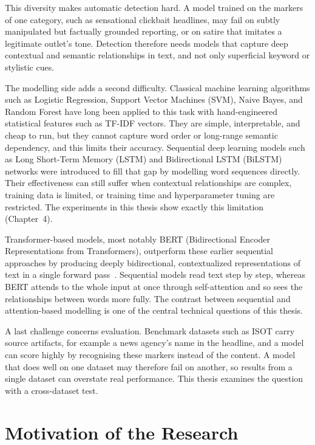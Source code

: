 This diversity makes automatic detection hard. A model trained on the markers of one category, such as sensational clickbait headlines, may fail on subtly manipulated but factually grounded reporting, or on satire that imitates a legitimate outlet's tone. Detection therefore needs models that capture deep contextual and semantic relationships in text, and not only superficial keyword or stylistic cues.

The modelling side adds a second difficulty. Classical machine learning algorithms such as Logistic Regression, Support Vector Machines (SVM), Naive Bayes, and Random Forest have long been applied to this task with hand-engineered statistical features such as TF-IDF vectors. They are simple, interpretable, and cheap to run, but they cannot capture word order or long-range semantic dependency, and this limits their accuracy. Sequential deep learning models such as Long Short-Term Memory (LSTM) and Bidirectional LSTM (BiLSTM) networks were introduced to fill that gap by modelling word sequences directly. Their effectiveness can still suffer when contextual relationships are complex, training data is limited, or training time and hyperparameter tuning are restricted. The experiments in this thesis show exactly this limitation (Chapter~4).

Transformer-based models, most notably BERT (Bidirectional Encoder Representations from Transformers), outperform these earlier sequential approaches by producing deeply bidirectional, contextualized representations of text in a single forward pass~\citep{Kaliyar2021FakeBERT,Mehta2022RecentTrends}. Sequential models read text step by step, whereas BERT attends to the whole input at once through self-attention and so sees the relationships between words more fully. The contrast between sequential and attention-based modelling is one of the central technical questions of this thesis.

A last challenge concerns evaluation. Benchmark datasets such as ISOT carry source artifacts, for example a news agency's name in the headline, and a model can score highly by recognising these markers instead of the content. A model that does well on one dataset may therefore fail on another, so results from a single dataset can overstate real performance. This thesis examines the question with a cross-dataset test.

\section{Motivation of the Research}


